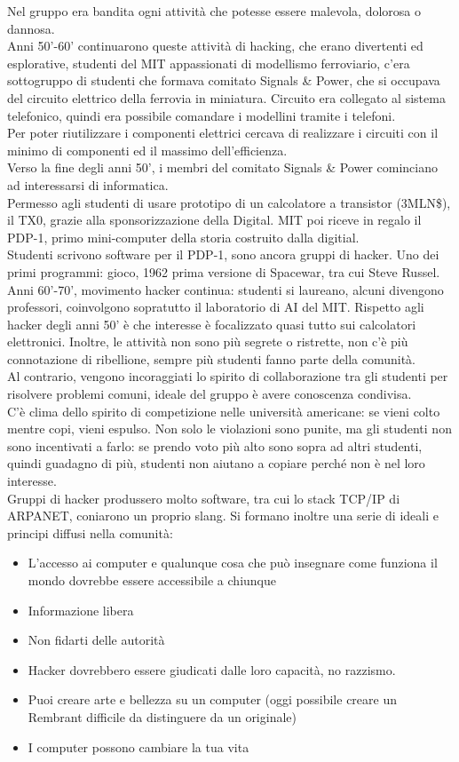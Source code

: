 \documentclass[12pt, oneside]{extbook}
\begin{document}
Nel gruppo era bandita ogni attività che potesse essere malevola, dolorosa o dannosa.\\ Anni 50'-60' continuarono queste attività di hacking, che erano divertenti ed esplorative, studenti del MIT appassionati di modellismo ferroviario, c'era sottogruppo di studenti che formava comitato Signals \& Power, che si occupava del circuito elettrico della ferrovia in miniatura. Circuito era collegato al sistema telefonico, quindi era possibile comandare i modellini tramite i telefoni.\\ Per poter riutilizzare i componenti elettrici cercava di realizzare i circuiti con il minimo di componenti ed il massimo dell'efficienza.\\ Verso la fine degli anni 50', i membri del comitato Signals \& Power cominciano ad interessarsi di informatica.\\ Permesso agli studenti di usare prototipo di un calcolatore a transistor (3MLN\$), il TX0, grazie alla sponsorizzazione della Digital. MIT poi riceve in regalo il PDP-1, primo mini-computer della storia costruito dalla digitial.\\ Studenti scrivono software per il PDP-1, sono ancora gruppi di hacker. Uno dei primi programmi: gioco, 1962 prima versione di Spacewar\!, tra cui Steve Russel.\\ Anni 60'-70', movimento hacker continua: studenti si laureano, alcuni divengono professori, coinvolgono sopratutto il laboratorio di AI del MIT. Rispetto agli hacker degli anni 50' è che interesse è focalizzato quasi tutto sui calcolatori elettronici. Inoltre, le attività non sono più segrete o ristrette, non c'è più connotazione di ribellione, sempre più studenti fanno parte della comunità.\\ Al contrario, vengono incoraggiati lo spirito di collaborazione tra gli studenti per risolvere problemi comuni, ideale del gruppo è avere conoscenza condivisa.\\ C'è clima dello spirito di competizione nelle università americane: se vieni colto mentre copi, vieni espulso. Non solo le violazioni sono punite, ma gli studenti non sono incentivati a farlo: se prendo voto più alto sono sopra ad altri studenti, quindi guadagno di più, studenti non aiutano a copiare perché non è nel loro interesse.\\ Gruppi di hacker produssero molto software, tra cui lo stack TCP/IP di ARPANET, coniarono un proprio slang. Si formano inoltre una serie di ideali e principi diffusi nella comunità:
\begin{itemize}
\item L'accesso ai computer e qualunque cosa che può insegnare come funziona il mondo dovrebbe essere accessibile a chiunque
\item Informazione libera
\item Non fidarti delle autorità
\item Hacker dovrebbero essere giudicati dalle loro capacità, no razzismo.
\item Puoi creare arte e bellezza su un computer (oggi possibile creare un Rembrant difficile da distinguere da un originale)
\item I computer possono cambiare la tua vita
\end{itemize}
\end{document}
